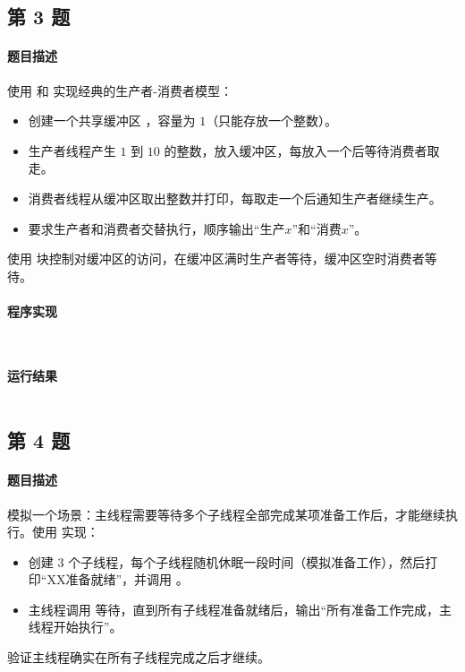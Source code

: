 \documentclass{academics}
\begin{document}
\subsection{第 3 题}

\paragraph{题目描述} {
    使用  和  实现经典的生产者-消费者模型：
    \begin{itemize}
        \item 创建一个共享缓冲区 ，容量为 $1$（只能存放一个整数）。
        \item 生产者线程产生 $1$ 到 $10$ 的整数，放入缓冲区，每放入一个后等待消费者取走。
        \item 消费者线程从缓冲区取出整数并打印，每取走一个后通知生产者继续生产。
        \item 要求生产者和消费者交替执行，顺序输出``生产$x$''和``消费$x$''。
    \end{itemize}
    使用  块控制对缓冲区的访问，在缓冲区满时生产者等待，缓冲区空时消费者等待。
}

\paragraph{程序实现} {
    \inputminted[label=Buffer.java]{java}{../src/P03/Buffer.java}
    \inputminted[label=ProducerConsumer.java]{java}{../src/P03/ProducerConsumer.java}
}

\paragraph{运行结果} {
    \inputminted{text}{../res/P03.out}
}

\subsection{第 4 题}

\paragraph{题目描述} {
    模拟一个场景：主线程需要等待多个子线程全部完成某项准备工作后，才能继续执行。使用  实现：
    \begin{itemize}
        \item 创建 $3$ 个子线程，每个子线程随机休眠一段时间（模拟准备工作），然后打印``XX准备就绪''，并调用 。
        \item 主线程调用  等待，直到所有子线程准备就绪后，输出``所有准备工作完成，主线程开始执行''。
    \end{itemize}
    验证主线程确实在所有子线程完成之后才继续。
}
\end{document}
